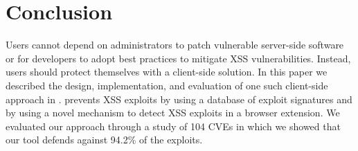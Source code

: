 \section{Conclusion}

Users cannot depend on administrators to patch vulnerable server-side
software or for developers to adopt best practices to mitigate XSS
vulnerabilities. Instead, users should protect themselves with a
client-side solution. In this paper we described the design,
implementation, and evaluation of one such client-side approach in
\sys.
%
\sys prevents \ac{XSS} exploits by using a database of exploit
signatures and by using a novel mechanism to detect XSS exploits in a
browser extension.
%
We evaluated our approach through a study of 104 CVEs in which we
showed that our tool defends against 94.2\% of the exploits.




